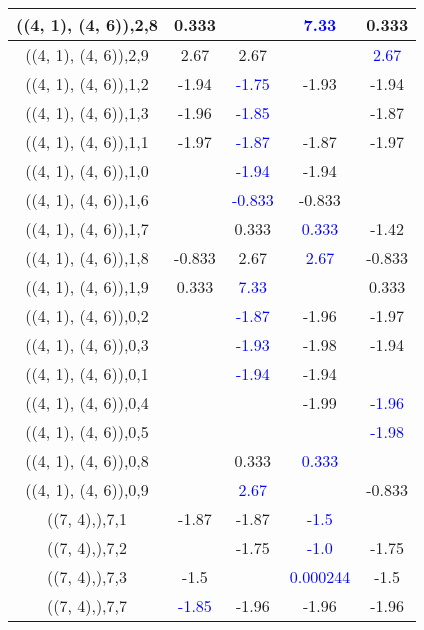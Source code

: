 \documentclass{article}
\begin{document}
\begin{center}
\begin{longtable}{|c|c|c|c|c|}
        	\hline
        	((4, 1), (4, 6)),2,8&0.333&& \textcolor{blue}{7.33}&0.333\\
        	\hline
        	((4, 1), (4, 6)),2,9&2.67&2.67&& \textcolor{blue}{2.67}\\
        	\hline
        	((4, 1), (4, 6)),1,2&-1.94& \textcolor{blue}{-1.75}&-1.93&-1.94\\
        	\hline
        	((4, 1), (4, 6)),1,3&-1.96& \textcolor{blue}{-1.85}&&-1.87\\
        	\hline
        	((4, 1), (4, 6)),1,1&-1.97& \textcolor{blue}{-1.87}&-1.87&-1.97\\
        	\hline
        	((4, 1), (4, 6)),1,0&& \textcolor{blue}{-1.94}&-1.94&\\
        	\hline
        	((4, 1), (4, 6)),1,6&& \textcolor{blue}{-0.833}&-0.833&\\
        	\hline
        	((4, 1), (4, 6)),1,7&&0.333& \textcolor{blue}{0.333}&-1.42\\
        	\hline
        	((4, 1), (4, 6)),1,8&-0.833&2.67& \textcolor{blue}{2.67}&-0.833\\
        	\hline
        	((4, 1), (4, 6)),1,9&0.333& \textcolor{blue}{7.33}&&0.333\\
        	\hline
        	((4, 1), (4, 6)),0,2&& \textcolor{blue}{-1.87}&-1.96&-1.97\\
        	\hline
        	((4, 1), (4, 6)),0,3&& \textcolor{blue}{-1.93}&-1.98&-1.94\\
        	\hline
        	((4, 1), (4, 6)),0,1&& \textcolor{blue}{-1.94}&-1.94&\\
        	\hline
        	((4, 1), (4, 6)),0,4&&&-1.99& \textcolor{blue}{-1.96}\\
        	\hline
        	((4, 1), (4, 6)),0,5&&&& \textcolor{blue}{-1.98}\\
        	\hline
        	((4, 1), (4, 6)),0,8&&0.333& \textcolor{blue}{0.333}&\\
        	\hline
        	((4, 1), (4, 6)),0,9&& \textcolor{blue}{2.67}&&-0.833\\
        	\hline
        	((7, 4),),7,1&-1.87&-1.87& \textcolor{blue}{-1.5}&\\
        	\hline
        	((7, 4),),7,2&&-1.75& \textcolor{blue}{-1.0}&-1.75\\
        	\hline
        	((7, 4),),7,3&-1.5&& \textcolor{blue}{0.000244}&-1.5\\
        	\hline
        	((7, 4),),7,7& \textcolor{blue}{-1.85}&-1.96&-1.96&-1.96\\
        	\hline

\end{longtable}
\end{center}
\end{document}
